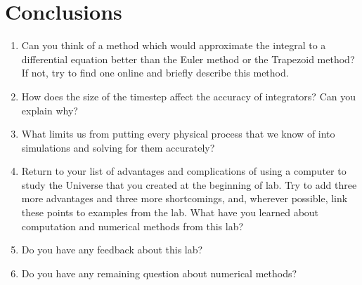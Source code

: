 \documentclass[11pt]{article}
\begin{document}
\section{Conclusions}
\begin{enumerate}
    \item Can you think of a method which would approximate the integral to a differential equation better than the Euler method or the Trapezoid method? If not, try to find one online and briefly describe this method.
    
    \item How does the size of the timestep affect the accuracy of integrators? Can you explain why?
    
    \item What limits us from putting every physical process that we know of into simulations and solving for them accurately?
    
    \item Return to your list of advantages and complications of using a computer to study the Universe that you created at the beginning of lab. Try to add three more advantages and three more shortcomings, and, wherever possible, link these points to examples from the lab. What have you learned about computation and numerical methods from this lab?
    
    \item Do you have any feedback about this lab?
    
    \item Do you have any remaining question about numerical methods?
\end{enumerate}
\end{document}
